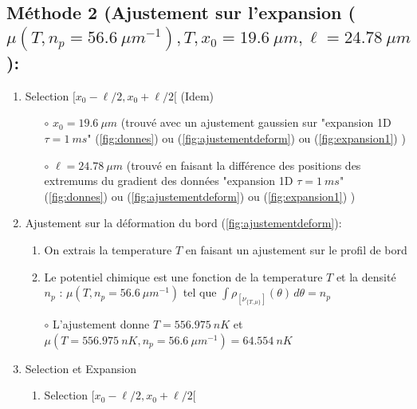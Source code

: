 \documentclass[a3, 10pt,twoside]{article}          %
\theoremstyle{plain}
\theoremstyle{definition}
\theoremstyle{remark}
\theoremstyle{definition} %
\begin{document}
\begin{enumerate}[label =\Alph*)]
\begin{enumerate}[label =\alph*)]
					\end{enumerate}
			\end{enumerate}
			
	\subsection{Méthode 2 (Ajustement sur l'expansion ($\mu( T , n_p = 56.6 ~{\mu m}^{-1} ) , T , x_0 = 19.6 ~\mu m  , \ell = 24.78 ~ \mu m  $ ): } 
		
			\begin{enumerate}[label =\Alph*)]
			
				
				\item Selection $[ x_0 - \ell/2 , x_0 + \ell/2[$ (Idem)
					\begin{itemize}
								\item[$\circ$] $x_0 = 19.6 ~\mu m $ (trouvé avec un ajustement gaussien sur {\color{OliveGreen}"expansion 1D $\tau =1~ms$" (\ref{fig:donnes})} ou {\color{orange} (\ref{fig:ajustementdeform}) } ou {\color{blue}(\ref{fig:expansion1})} ) 
								\item[$\circ$] $\ell = 24.78 ~ \mu m $ (trouvé en faisant la différence des positions des extremums du gradient des données {\color{OliveGreen}"expansion 1D $\tau =1~ms$" (\ref{fig:donnes})} ou {\color{orange} (\ref{fig:ajustementdeform}) } ou {\color{blue}(\ref{fig:expansion1})} )
							\end{itemize}
				
				\item Ajustement sur la déformation du bord (\ref{fig:ajustementdeform}):

					\begin{enumerate}[label =\alph*)]
						\item On extrais la temperature $T$ en faisant un ajustement sur le profil de bord 
						\item Le potentiel chimique est une fonction de la temperature $T$ et la densité $n_p$ : $\mu( T , n_p = 56.6 ~{\mu m}^{-1} )$ tel que $\int \rho_{ [ \nu_{\{T,\mu\}} ] } (\theta) \, d \theta  = n_p $ 
						\item[$\circ$] L'ajustement donne $T = 556.975 ~nK$ et $\mu( T=556.975 ~nK , n_p = 56.6 ~{\mu m}^{-1} ) = 64.554~nK $ 
					\end{enumerate}
				\item Selection et Expansion 
					\begin{enumerate}[label =\alph*)]
						\item Selection $[ x_0 - \ell/2 , x_0 + \ell/2[$ 
							 

\end{enumerate}
\end{enumerate}
\end{document}
